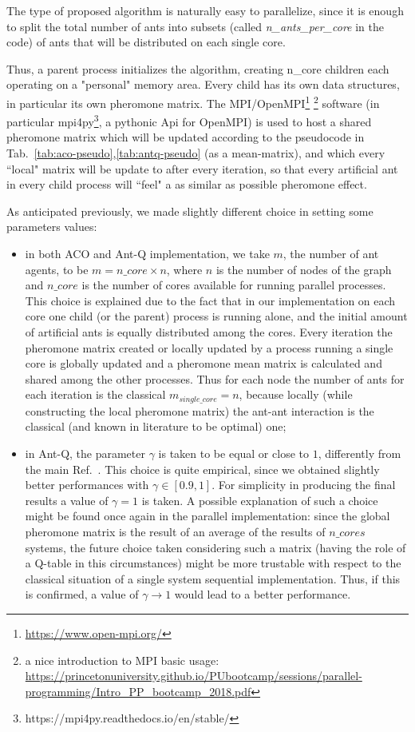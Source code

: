 \documentclass[10pt]{article}
\begin{document}
The type of proposed algorithm is naturally easy to parallelize, since it is enough to split the total number of ants into subsets (called \textit{n\_ants\_per\_core} in the code) of ants that will be distributed on each single core.

Thus, a parent process initializes the algorithm, creating n\_core children each operating on a "personal" memory area. 
Every child has its own data structures, in particular its own pheromone matrix. 
The MPI/OpenMPI\footnote{\url{https://www.open-mpi.org/}} \footnote{a nice introduction to MPI basic usage: \url{https://princetonuniversity.github.io/PUbootcamp/sessions/parallel-programming/Intro_PP_bootcamp_2018.pdf}} software (in particular mpi4py\footnote{https://mpi4py.readthedocs.io/en/stable/}, a pythonic Api for OpenMPI) is used to host a shared pheromone matrix which will be updated according to the pseudocode in Tab.~\ref{tab:aco-pseudo},\ref{tab:antq-pseudo} (as a mean-matrix), and which every ``local" matrix will be update to after every iteration, so that every artificial ant in every child process will ``feel" a as similar as possible pheromone effect.

As anticipated previously, we made slightly different choice in setting some parameters values:
\begin{itemize}
\item in both ACO and Ant-Q implementation, we take $m$, the number of ant agents, to be $m=n\_core\times n$, where $n$ is the number of nodes of the graph and $n\_core$ is the number of cores available for running parallel processes.
This choice is explained due to the fact that in our implementation on each core one child (or the parent) process is running alone, and the initial amount of artificial ants is equally distributed among the cores. Every iteration the pheromone matrix created or locally updated by a process running a single core is globally updated and a pheromone mean matrix is calculated and shared among the other processes. Thus for each node the number of ants for each iteration is the classical $m_{single\_core}=n$, because locally (while constructing the local pheromone matrix) the ant-ant interaction is the classical (and known in literature to be optimal) one;
\item in Ant-Q, the parameter $\gamma$ is taken to be equal or close to $1$, differently from the main Ref.~\cite{undici}. This choice is quite empirical, since we obtained slightly better performances with $\gamma \in [0.9,1]$. For simplicity in producing the final results a value of $\gamma=1$ is taken. A possible explanation of such a choice might be found once again in the parallel implementation: since the global pheromone matrix is the result of an average of the results of $n\_cores$ systems, the future choice taken considering such a matrix (having the role of a Q-table in this circumstances) might be more trustable with respect to the classical situation of a single system sequential implementation. Thus, if this is confirmed, a value of $\gamma \rightarrow 1$ would lead to a better performance.
\end{itemize}
\end{document}
